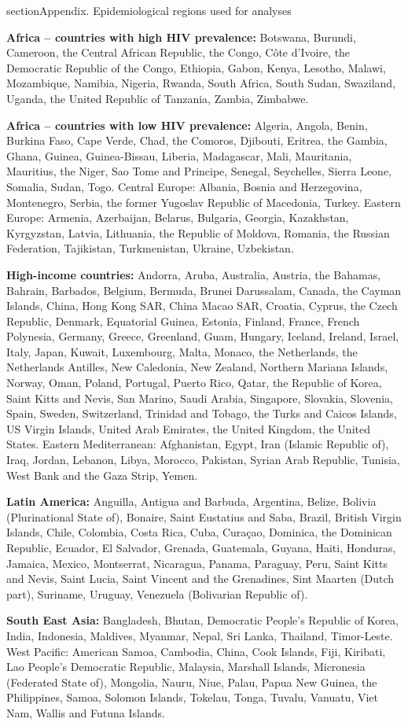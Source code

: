 \*section{Appendix. Epidemiological regions used for analyses}

\textbf{Africa – countries with high HIV prevalence:} Botswana, Burundi, Cameroon, the Central African Republic, the Congo, Côte d’Ivoire, the Democratic Republic of the Congo, Ethiopia, Gabon, Kenya, Lesotho, Malawi, Mozambique, Namibia, Nigeria, Rwanda, South Africa, South Sudan, Swaziland, Uganda, the United Republic of Tanzania, Zambia, Zimbabwe. 

\textbf{Africa – countries with low HIV prevalence:} Algeria, Angola, Benin, Burkina Faso, Cape Verde, Chad, the Comoros, Djibouti, Eritrea, the Gambia, Ghana, Guinea, Guinea-Bissau, Liberia, Madagascar, Mali, Mauritania, Mauritius, the Niger, Sao Tome and Principe, Senegal, Seychelles, Sierra Leone, Somalia, Sudan, Togo.
Central Europe: Albania, Bosnia and Herzegovina, Montenegro, Serbia, the former Yugoslav Republic of Macedonia, Turkey.
Eastern Europe: Armenia, Azerbaijan, Belarus, Bulgaria, Georgia, Kazakhstan, Kyrgyzstan, Latvia, Lithuania, the Republic of Moldova, Romania, the Russian Federation, Tajikistan, Turkmenistan, Ukraine, Uzbekistan.

\textbf{High-income countries:} Andorra, Aruba, Australia, Austria, the Bahamas, Bahrain, Barbados, Belgium, Bermuda, Brunei Darussalam, Canada, the Cayman Islands, China, Hong Kong SAR, China Macao SAR, Croatia, Cyprus, the Czech Republic, Denmark, Equatorial Guinea, Estonia, Finland, France, French Polynesia, Germany, Greece, Greenland, Guam, Hungary, Iceland, Ireland, Israel, Italy, Japan, Kuwait, Luxembourg, Malta, Monaco, the Netherlands, the Netherlands Antilles, New Caledonia, New Zealand, Northern Mariana Islands, Norway, Oman, Poland, Portugal, Puerto Rico, Qatar, the Republic of Korea, Saint Kitts and Nevis, San Marino, Saudi Arabia, Singapore, Slovakia, Slovenia, Spain, Sweden, Switzerland, Trinidad and Tobago, the Turks and Caicos Islands, US Virgin Islands, United Arab Emirates, the United Kingdom, the United States.
Eastern Mediterranean: Afghanistan, Egypt, Iran (Islamic Republic of), Iraq, Jordan, Lebanon, Libya, Morocco, Pakistan, Syrian Arab Republic, Tunisia, West Bank and the Gaza Strip, Yemen. 

\textbf{Latin America:} Anguilla, Antigua and Barbuda, Argentina, Belize, Bolivia (Plurinational State of), Bonaire, Saint Eustatius and Saba, Brazil, British Virgin Islands, Chile, Colombia, Costa Rica, Cuba, Curaçao, Dominica, the Dominican Republic, Ecuador, El Salvador, Grenada, Guatemala, Guyana, Haiti, Honduras, Jamaica, Mexico, Montserrat, Nicaragua, Panama, Paraguay, Peru, Saint Kitts and Nevis, Saint Lucia, Saint Vincent and the Grenadines, Sint Maarten (Dutch part), Suriname, Uruguay, Venezuela (Bolivarian Republic of).

\textbf{South East Asia:} Bangladesh, Bhutan, Democratic People’s Republic of Korea, India, Indonesia, Maldives, Myanmar, Nepal, Sri Lanka, Thailand, Timor-Leste.
West Pacific: American Samoa, Cambodia, China, Cook Islands, Fiji, Kiribati, Lao People’s Democratic Republic, Malaysia, Marshall Islands, Micronesia (Federated State of), Mongolia, Nauru, Niue, Palau, Papua New Guinea, the Philippines, Samoa, Solomon Islands, Tokelau, Tonga, Tuvalu, Vanuatu, Viet Nam, Wallis and Futuna Islands. 
